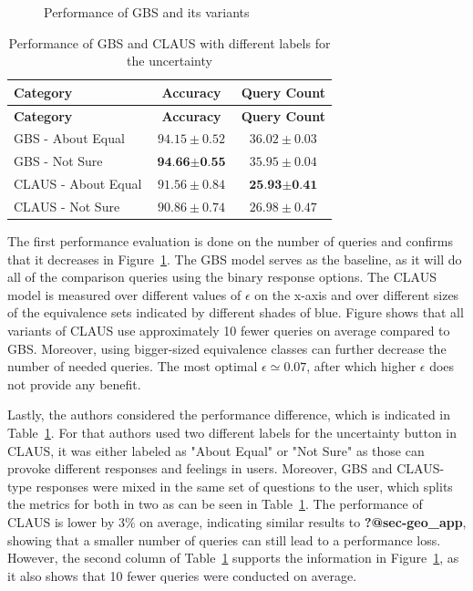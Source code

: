 \documentclass[
  letterpaper,
  numbers=noenddot,
  DIV=11]{scrreprt}
\theoremstyle{definition}
\theoremstyle{plain}
\theoremstyle{plain}
\theoremstyle{remark}
\begin{document}
\begin{figure}


\caption{\label{fig-claus_num}Performance of GBS and its variants}

\end{figure}%

\begin{longtable}[]{@{}lcc@{}}
\caption{Performance of GBS and CLAUS with different labels for the
uncertainty}\label{tbl-claus_tab}\tabularnewline
\toprule\noalign{}
\textbf{Category} & \textbf{Accuracy} & \textbf{Query Count} \\
\midrule\noalign{}
\endfirsthead
\toprule\noalign{}
\textbf{Category} & \textbf{Accuracy} & \textbf{Query Count} \\
\midrule\noalign{}
\endhead
\bottomrule\noalign{}
\endlastfoot
GBS - About Equal & \(94.15 \pm 0.52\) & \(36.02 \pm 0.03\) \\
GBS - Not Sure & \(\textbf{94.66} \pm \textbf{0.55}\) &
\(35.95 \pm 0.04\) \\
CLAUS - About Equal & \(91.56 \pm 0.84\) &
\(\textbf{25.93} \pm \textbf{0.41}\) \\
CLAUS - Not Sure & \(90.86 \pm 0.74\) & \(26.98 \pm 0.47\) \\
\end{longtable}

The first performance evaluation is done on the number of queries and
confirms that it decreases in Figure~\ref{fig-claus_num}. The GBS model
serves as the baseline, as it will do all of the comparison queries
using the binary response options. The CLAUS model is measured over
different values of \(\epsilon\) on the x-axis and over different sizes
of the equivalence sets indicated by different shades of blue. Figure
shows that all variants of CLAUS use approximately 10 fewer queries on
average compared to GBS. Moreover, using bigger-sized equivalence
classes can further decrease the number of needed queries. The most
optimal \(\epsilon \simeq 0.07\), after which higher \(\epsilon\) does
not provide any benefit.

Lastly, the authors considered the performance difference, which is
indicated in Table~\ref{tbl-claus_tab}. For that authors used two
different labels for the uncertainty button in CLAUS, it was either
labeled as "About Equal" or "Not Sure" as those can provoke different
responses and feelings in users. Moreover, GBS and CLAUS-type responses
were mixed in the same set of questions to the user, which splits the
metrics for both in two as can be seen in Table~\ref{tbl-claus_tab}. The
performance of CLAUS is lower by \(3\%\) on average, indicating similar
results to \textbf{?@sec-geo\_app}, showing that a smaller number of
queries can still lead to a performance loss. However, the second column
of Table~\ref{tbl-claus_tab} supports the information in
Figure~\ref{fig-claus_num}, as it also shows that 10 fewer queries were
conducted on average.
\end{document}
